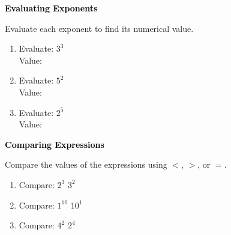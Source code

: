 \documentclass[12pt, letterpaper, fleqn]{article}
\newcommand{\blanklong}{\underline{\hspace{6.5cm}}}
\newcommand{\blankshorter}{\underline{\hspace{1.5cm}}}
\begin{document}
\newpage

\begin{tcolorbox}[colback=black!10]
\large\textcolor{black}{\textbf{Evaluating Exponents}}
\end{tcolorbox}

\noindent
Evaluate each exponent to find its numerical value.

\vspace{3mm}

\begin{enumerate}[itemsep=2.2cm, leftmargin=0.6cm]

\item Evaluate: $3^3$ \\
Value: \blanklong

\vspace{2cm}

\item Evaluate: $5^2$ \\
Value: \blanklong

\vspace{2cm}

\item Evaluate: $2^5$ \\
Value: \blanklong

\vspace{2cm}

\end{enumerate}

\newpage

\begin{tcolorbox}[colback=black!10]
\large\textcolor{black}{\textbf{Comparing Expressions}}
\end{tcolorbox}

\noindent
Compare the values of the expressions using $<$, $>$, or $=$.

\vspace{3mm}

\begin{enumerate}[itemsep=2.2cm, leftmargin=0.6cm]

\item Compare: $2^3$ \quad \blankshorter \quad $3^2$

\vspace{2cm}

\item Compare: $1^{10}$ \quad \blankshorter \quad $10^1$

\vspace{2cm}

\item Compare: $4^2$ \quad \blankshorter \quad $2^4$

\vspace{2cm}

\end{enumerate}
\end{document}
